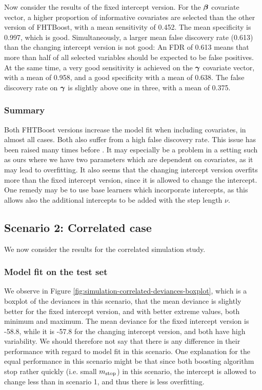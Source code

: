 Now consider the results of the fixed intercept version.
For the $\boldsymbol{\beta}$ covariate vector, a higher proportion of informative covariates are selected than the other version of FHTBoost, with a mean sensitivity of 0.452.
The mean specificity is 0.997, which is good.
Simultaneously, a larger mean false discovery rate (0.613) than the changing intercept version is not good:
An FDR of 0.613 means that more than half of all selected variables should be expected to be false positives.
At the same time, a very good sensitivity is achieved on the $\boldsymbol{\gamma}$ covariate vector, with a mean of 0.958, and a good specificity with a mean of 0.638.
The false discovery rate on $\boldsymbol{\gamma}$ is slightly above one in three, with a mean of 0.375.

\subsubsection{Summary}
Both FHTBoost versions increase the model fit when including covariates, in almost all cases.
Both also suffer from a high false discovery rate.
This issue has been raised many times before \citep{buhlmann2007, buhlmann-yu, thomas2018}.
It may especially be a problem in a setting such as ours where we have two parameters which are dependent on covariates, as it may lead to overfitting.
It also seems that the changing intercept version overfits more than the fixed intercept version, since it is allowed to change the intercept.
One remedy may be to use base learners which incorporate intercepts, as this allows also the additional intercepts to be added with the step length $\nu$.

\subsection{Scenario 2: Correlated case}
We now consider the results for the correlated simulation study.

\subsubsection{Model fit on the test set}
We observe in Figure \ref{fig:simulation-correlated-deviances-boxplot}, which is a boxplot of the deviances in this scenario, that the mean deviance is slightly better for the fixed intercept version, and with better extreme values, both minimum and maximum.
The mean deviance for the fixed intercept version is -58.8, while it is -57.8 for the changing intercept version, and both have high variability.
We should therefore not say that there is any difference in their performance with regard to model fit in this scenario.
One explanation for the equal performance in this scenario might be that since both boosting algorithm stop rather quickly (i.e. small $m_{\text{stop}}$) in this scenario, the intercept is allowed to change less than in scenario 1, and thus there is less overfitting.

